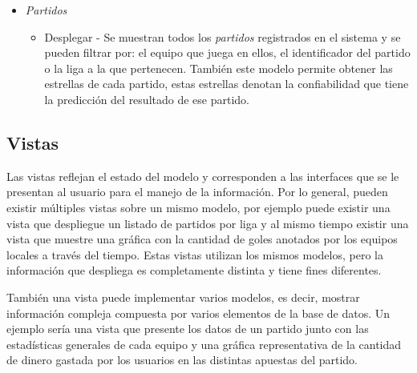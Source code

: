 \begin{itemize}
\begin{itemize}
				\end{itemize}
			\item \emph{Partidos}
				\begin{itemize}
					\item Desplegar - Se muestran todos los \emph{partidos} registrados en el sistema y se pueden filtrar por: el equipo que juega en ellos, el identificador del partido o la liga a la que pertenecen. También este modelo permite obtener las estrellas de cada partido, estas estrellas denotan la confiabilidad que tiene la predicción del resultado de ese partido.
				\end{itemize}
		\end{itemize}

		\subsection{Vistas}

		\graphicspath{{/Users/brunomedina/Dropbox/Tesis-Egobets/egobets-notas/resources/vistas/}}

		Las vistas reflejan el estado del modelo y corresponden a las interfaces que se le presentan al usuario para el manejo de la información. Por lo general, pueden existir múltiples vistas sobre un mismo modelo, por ejemplo puede existir una vista que despliegue un listado de  partidos por liga y al mismo tiempo existir una vista que muestre una gráfica con la cantidad de goles anotados por los equipos locales a través del tiempo. Estas vistas utilizan los mismos modelos, pero la información que despliega es completamente distinta y tiene fines diferentes.

		También una vista puede implementar varios modelos, es decir, mostrar información compleja compuesta por varios elementos de la base de datos. Un ejemplo sería una vista que presente los datos de un partido junto con las estadísticas generales de cada equipo y una gráfica representativa de la cantidad de dinero gastada por los usuarios en las distintas apuestas del partido.

